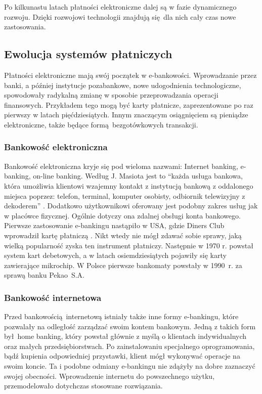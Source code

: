 Po kilkunastu latach płatności elektroniczne dalej są w fazie dynamicznego rozwoju. Dzięki rozwojowi technologii znajdują się dla nich cały czas nowe zastosowania. 


\subsection{Ewolucja systemów płatniczych}

Płatności elektroniczne mają swój początek w e-bankowości. Wprowadzanie przez banki, a później instytucje pozabankowe, nowe udogodnienia technologiczne, spowodowały radykalną zmianę w sposobie przeprowadzania operacji finansowych. Przykładem tego mogą być karty płatnicze, zaprezentowane po raz pierwszy w latach pięćdziesiątych. Innym znaczącym osiągnięciem są pieniądze elektroniczne, także będące formą bezgotówkowych transakcji. 

\subsubsection*{Bankowość elektroniczna}

Bankowość elektroniczna kryje się pod wieloma nazwami: Internet banking, e-banking, on-line banking. Według J. Masiota jest to ``każda usługa bankowa, która umożliwia klientowi wzajemny kontakt z instytucją bankową z oddalonego miejsca poprzez: telefon, terminal, komputer osobisty, odbiornik telewizyjny z dekoderem'' \cite{pieniadz_elektroniczny-analiza}. Dodatkowo użytkownikowi oferowany jest podobny zakres usług jak w placówce fizycznej. Ogólnie dotyczy ona zdalnej obsługi konta bankowego. Pierwsze zastosowanie e-bankingu nastąpiło w USA, gdzie Diners Club wprowadził kartę płatniczą \cite{pieniadz_elektroniczny-analiza}. Nikt wtedy nie mógł zdawać sobie sprawy, jaką wielką popularność zyska ten instrument płatniczy. Następnie w 1970 r. powstał system kart debetowych, a w latach osiemdziesiątych pojawiły się  karty zawierające mikrochip. W Polsce pierwsze bankomaty powstały w 1990~r. za sprawą banku Pekao~S.A.

\subsubsection*{Bankowość internetowa}

Przed bankowością internetową istniały także inne formy e-bankingu, które pozwalały na odległość zarządzać swoim kontem bankowym. Jedną z takich form był home banking, który powstał głównie z myślą o klientach indywidualnych oraz małych przedsiębiorstwach. Po zainstalowaniu specjalnego oprogramowania, bądź kupienia odpowiedniej przystawki, klient mógł wykonywać operacje na swoim koncie. Ta i podobne odmiany e-bankingu nie zdążyły na dobre zaznaczyć swojej obecności. Wprowadzenie internetu do powszechnego użytku, przemodelowało dotychczas stosowane rozwiązania.

